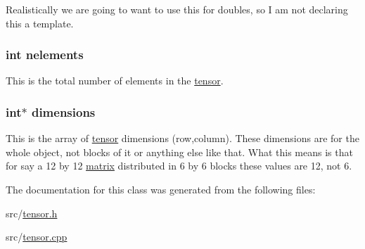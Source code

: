 Realistically we are going to want to use this for doubles, so I am not declaring this a template. \hypertarget{classJKBuilder_1_1tensor_a23ae6a00bed19d2ad34d439636e797da}{
\subsubsection[{nelements}]{\setlength{\rightskip}{0pt plus 5cm}int {\bf nelements}}}
\label{classJKBuilder_1_1tensor_a23ae6a00bed19d2ad34d439636e797da}


This is the total number of elements in the \hyperlink{classJKBuilder_1_1tensor}{tensor}. \hypertarget{classJKBuilder_1_1tensor_a2ce1e6e0782ddee097f2c4aa2663d3e9}{
\subsubsection[{dimensions}]{\setlength{\rightskip}{0pt plus 5cm}int$\ast$ {\bf dimensions}}}
\label{classJKBuilder_1_1tensor_a2ce1e6e0782ddee097f2c4aa2663d3e9}


This is the array of \hyperlink{classJKBuilder_1_1tensor}{tensor} dimensions (row,column). These dimensions are for the whole object, not blocks of it or anything else like that. What this means is that for say a 12 by 12 \hyperlink{classJKBuilder_1_1matrix}{matrix} distributed in 6 by 6 blocks these values are 12, not 6. 

The documentation for this class was generated from the following files:\begin{DoxyCompactItemize}
\item 
src/\hyperlink{tensor_8h}{tensor.h}\item 
src/\hyperlink{tensor_8cpp}{tensor.cpp}\end{DoxyCompactItemize}
